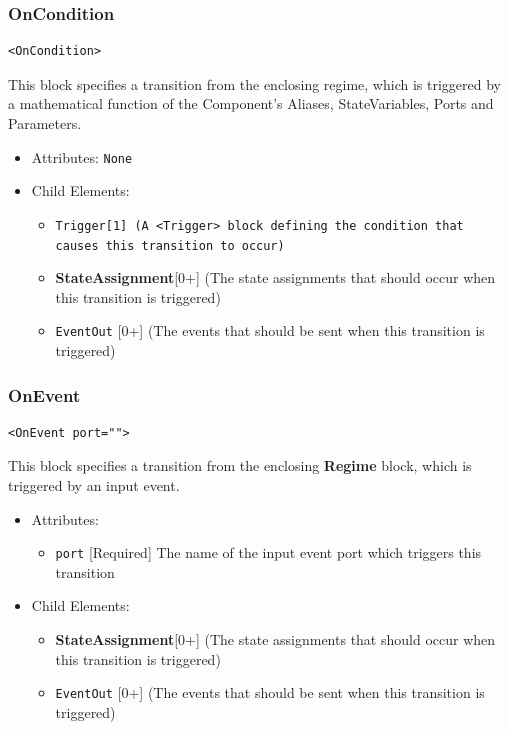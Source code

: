 \documentclass{article}
\newcommand{\StateAssignment}{{\bf{StateAssignment}}\xspace}
\newcommand{\Regime}{{\bf{Regime}}\xspace}
\newcommand{\Trigger}{\tt{Trigger}}
\begin{document}
\subsubsection{OnCondition}
%
\begin{lstlisting}
<OnCondition>
\end{lstlisting}

This block specifies a transition from the enclosing regime, which is triggered
by a mathematical function of the Component's Aliases, StateVariables, Ports and
Parameters.

\begin{itemize}
\item Attributes: \texttt{None}

\item Child Elements:
%
\begin{itemize}
\item \Trigger {[}1{]} (A \verb|<Trigger>| block defining the condition that causes this transition to occur)
\item \StateAssignment {[}0+{]} (The state assignments that should occur when this transition is triggered)
\item {\tt EventOut} {[}0+{]} (The events that should be sent when this transition is triggered)
\end{itemize}
\end{itemize}

\subsubsection{OnEvent}
%
\begin{lstlisting}
<OnEvent port="">
\end{lstlisting}

This block specifies a transition from the enclosing \Regime block, which is triggered
by an input event.

\begin{itemize}
\item Attributes:
%
\begin{itemize}
\item \verb|port| {[}Required{]} The name of the input event port which triggers this
transition
\end{itemize}

\item Child Elements:
%
\begin{itemize}
\item \StateAssignment {[}0+{]} (The state assignments that should occur when this
transition is triggered)
\item {\tt EventOut} {[}0+{]} (The events that should be sent when this transition is triggered)
\end{itemize}
\end{itemize}
\end{document}
